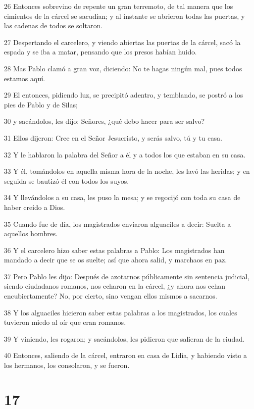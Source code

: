 \par 26 Entonces sobrevino de repente un gran terremoto, de tal manera que los cimientos de la cárcel se sacudían; y al instante se abrieron todas las puertas, y las cadenas de todos se soltaron.
\par 27 Despertando el carcelero, y viendo abiertas las puertas de la cárcel, sacó la espada y se iba a matar, pensando que los presos habían huido.
\par 28 Mas Pablo clamó a gran voz, diciendo: No te hagas ningún mal, pues todos estamos aquí.
\par 29 El entonces, pidiendo luz, se precipitó adentro, y temblando, se postró a los pies de Pablo y de Silas;
\par 30 y sacándolos, les dijo: Señores, ¿qué debo hacer para ser salvo?
\par 31 Ellos dijeron: Cree en el Señor Jesucristo, y serás salvo, tú y tu casa.
\par 32 Y le hablaron la palabra del Señor a él y a todos los que estaban en su casa.
\par 33 Y él, tomándolos en aquella misma hora de la noche, les lavó las heridas; y en seguida se bautizó él con todos los suyos.
\par 34 Y llevándolos a su casa, les puso la mesa; y se regocijó con toda su casa de haber creído a Dios.
\par 35 Cuando fue de día, los magistrados enviaron alguaciles a decir: Suelta a aquellos hombres.
\par 36 Y el carcelero hizo saber estas palabras a Pablo: Los magistrados han mandado a decir que se os suelte; así que ahora salid, y marchaos en paz.
\par 37 Pero Pablo les dijo: Después de azotarnos públicamente sin sentencia judicial, siendo ciudadanos romanos, nos echaron en la cárcel, ¿y ahora nos echan encubiertamente? No, por cierto, sino vengan ellos mismos a sacarnos.
\par 38 Y los alguaciles hicieron saber estas palabras a los magistrados, los cuales tuvieron miedo al oír que eran romanos.
\par 39 Y viniendo, les rogaron; y sacándolos, les pidieron que salieran de la ciudad.
\par 40 Entonces, saliendo de la cárcel, entraron en casa de Lidia, y habiendo visto a los hermanos, los consolaron, y se fueron.

\chapter{17}


